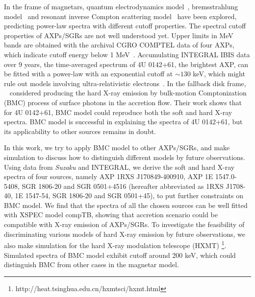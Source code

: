 \documentclass[]{raa}
\begin{document}
In the frame of magnetars, quantum electrodynamics model~\citep{Heyl05}, bremsstrahlung model~\citep{Beloborodov07} and resonant inverse Compton scattering model~\citep{Baring07} have been explored, predicting power-law spectra with different cutoff properties.
%
%
%
%
The spectral cutoff properties of AXPs/SGRs are not well understood yet.
%
Upper limits in MeV bands are obtained with the archival CGRO COMPTEL data of four AXPs, which indicate cutoff energy below 1 MeV~\citep{Kuiper06}.
%
%
Accumulating INTEGRAL IBIS data over 9 years, the time-averaged spectrum of 4U 0142+61, the brightest AXP,  can be fitted with a power-law with an exponential cutoff at $\sim 130$ keV, which might rule out models involving ultra-relativistic electrons~\citep{Wang13}.
%
In the fallback disk frame, ~\citet{Trumper10} considered producing the hard X-ray emission by bulk-motion Comptonization (BMC) process of surface photons in the accretion flow.
%
Their work shows that for 4U 0142+61, BMC model could reproduce both the soft and hard X-ray spectra.
%
BMC model is successful in explaining the spectra of 4U 0142+61, but its applicability to other sources remains in doubt.
%
%

In this work, we try to apply BMC model to other AXPs/SGRs, and make simulation to discuss how to distinguish different models by future observations.
%
Using data from {\it Suzaku} and INTEGRAL, we derive the soft and hard X-ray spectra of four sources, namely AXP 1RXS J170849-400910, AXP 1E 1547.0-5408, SGR 1806-20 and SGR 0501+4516 (hereafter abbreviated as 1RXS J1708-40, 1E 1547-54, SGR 1806-20 and SGR 0501+45), to put further constraints on BMC model.
%
We find that the spectra of all the chosen sources can be well fitted with XSPEC model compTB, showing that accretion scenario could be compatible with X-ray emission of AXPs/SGRs.
%
To investigate the feasibility of discriminating various models of hard X-ray emission by future observations, we also make simulation for the hard X-ray modulation telescope (HXMT) \footnote{http://heat.tsinghua.edu.cn/hxmtsci/hxmt.html}.
%
Simulated spectra of BMC model exhibit cutoff around 200 keV, which could distinguish BMC from other cases in the magnetar model.
%
\end{document}

